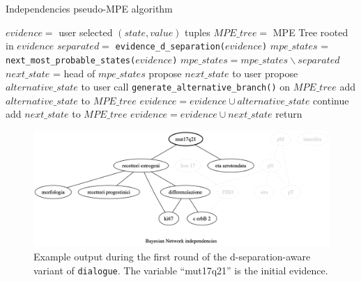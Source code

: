 \begin{algorithm}[htp!]
	\caption{Independencies pseudo-MPE algorithm}
	\label{alg:pseudo-mpe-independencies}
	\begin{algorithmic}
		\STATE $evidence = $ user selected $(state,value)$ tuples
		\STATE $MPE\_tree = $ MPE Tree rooted in $evidence$
			\STATE $separated = $ \texttt{evidence\_d\_separation($evidence$)} 
			\STATE $mpe\_states$ = \texttt{next\_most\_probable\_states($evidence$)}
			\STATE $mpe\_states = mpe\_states \smallsetminus separated$ 
				\STATE $next\_state$ = head of $mpe\_states$ 
				\STATE propose $next\_state$ to user 
						\STATE propose $alternative\_state$ to user 
							\STATE call \texttt{generate\_alternative\_branch()} on $MPE\_tree$ 
							\STATE add $alternative\_state$ to $MPE\_tree$
							\STATE $evidence = evidence \cup alternative\_state$
						\ELSE
							\STATE continue 
						\ENDIF
					\ENDFOR
				\ELSE
					\STATE add $next\_state$ to $MPE\_tree$
					\STATE $evidence = evidence \cup next\_state$
				\ENDIF
			\ELSE 
				\STATE return 
			\ENDIF
		\ENDWHILE
	\end{algorithmic}
\end{algorithm} 

\begin{figure}[htbp]
\centerline{\includegraphics[width=\columnwidth]{methodology/images/example-d-separation-mpe_1}}
\caption{Example output during the first round of the d-separation-aware variant of \texttt{dialogue}.
	The variable \enquote{mut17q21} is the initial evidence.}
\label{fig:pseudo-mpe-independencies_1}
\end{figure}

